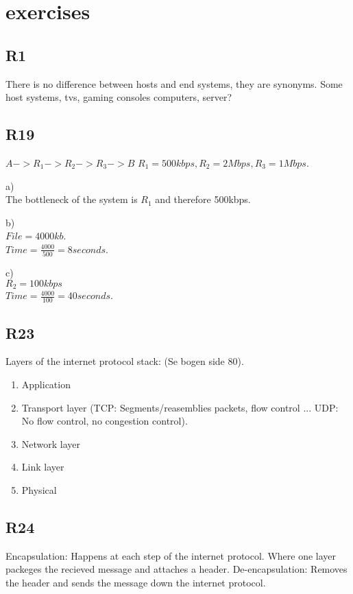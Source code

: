 \section{exercises}
\subsection{R1}
There is no difference between hosts and end systems, they are synonyms.
Some host systems, tvs, gaming consoles computers, server?

\subsection{R19}
$A->R_1->R_2->R_3->B$
$R_1 = 500kbps, R_2 = 2Mbps, R_3 = 1 Mbps$.

a)\\
The bottleneck of the system is $R_1$ and therefore 500kbps.

b)\\
$File = 4000 kb$.\\
$Time = \frac{4000}{500} = 8 seconds$.

c)\\
$R_2 = 100kbps$\\
$Time = \frac{4000}{100} = 40 seconds$.


\subsection{R23}
Layers of the internet protocol stack: (Se bogen side 80).
\begin{enumerate}
    \item Application
    \item Transport layer (TCP: Segments/reasemblies packets, flow control ... UDP: No flow control, no congestion control).
    \item Network layer
    \item Link layer
    \item Physical
\end{enumerate}

\subsection{R24}
Encapsulation: Happens at each step of the internet protocol. Where one layer packeges the recieved message and attaches a header.
De-encapsulation: Removes the header and sends the message down the internet protocol.

